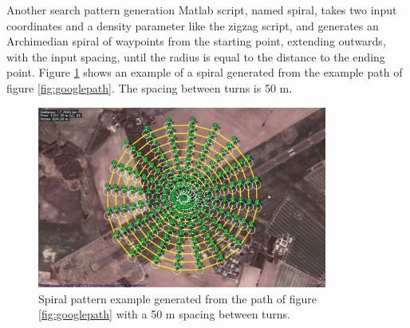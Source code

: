 Another search pattern generation Matlab script, named spiral, takes two input coordinates and a
density parameter like the zigzag script, and generates an Archimedian spiral of waypoints from the
starting point, extending outwards, with the input spacing, until the radius is equal to the
distance to the ending point.
Figure \ref{fig:spiral50m} shows an example of a spiral generated from the example path of figure
\ref{fig:googlepath}. The spacing between turns is 50 m.
\begin{figure}[ht]
	\centering
	\includegraphics[width=0.85\textwidth]{Images/spiral50m}
	\caption[Spiral pattern example.]{Spiral pattern example generated from the path of figure
		\ref{fig:googlepath} with a 50 m spacing between turns.}
	\label{fig:spiral50m}
\end{figure}

\newpage
